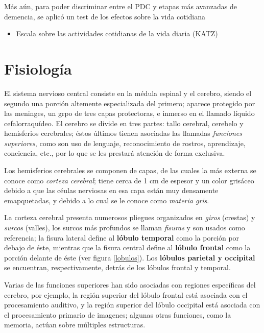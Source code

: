 Más aún, para poder discriminar entre el PDC y etapas más avanzadas de demencia, se aplicó un
test de los efectos sobre la vida cotidiana
%
\begin{itemize}
\item {Escala sobre las actividades cotidianas de la vida diaria (KATZ)} \cite{Roumec14}
\end{itemize}


\section{Fisiología}

El sistema nervioso central consiste en la médula espinal y el cerebro, siendo el segundo una
porción altemente especializada del primero; aparece protegido por las meninges, un grpo de tres 
capas protectoras, e inmerso en el llamado líquido cefalorraquídeo.
El cerebro se divide en tres partes: tallo cerebral, cerebelo y hemisferios cerebrales; éstos 
últimos tienen asociadas las llamadas \textit{funciones superiores}, como son uso de lenguaje,
reconocimiento de rostros, aprendizaje, conciencia, etc., por lo que se les prestará atención de 
forma exclusiva.

Los hemisferios cerebrales se componen de capas, de las cuales la más externa se conoce como
\textit{corteza cerebral}; tiene cerca de 1 cm de espesor y un color grisáceo debido a que las 
céulas nerviosas en esa capa están muy densamente emapquetadas, y debido a lo cual se le conoce
como \textit{materia gris}.

La corteza cerebral presenta numerosos pliegues organizados en \textit{giros} (crestas) y
\textit{surcos} (valles), los surcos más profundos se llaman \textit{fisuras} y son usados como 
referencia; la fisura lateral define al \textbf{lóbulo temporal} como la porción por debajo de 
éste, mientras que la fisura central define al \textbf{lóbulo frontal} como la porción delante de 
éste (ver figura \ref{lobulos}). Los \textbf{lóbulos parietal y occipital} se encuentran, 
respectivamente, detrás de los lóbulos frontal y temporal.

Varias de las funciones superiores han sido asociadas con regiones específicas del cerebro, por
ejemplo, la región superior del lóbulo frontal está asociada con el procesamiento auditivo, y la
región superior del lóbulo occipital está asociada con el procesamiento primario de imagenes;
algunas otras funciones, como la memoria, actúan sobre múltiples estructuras.

